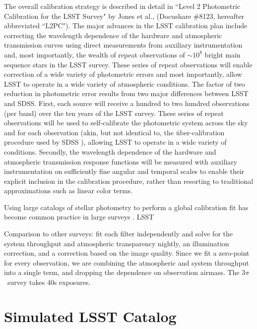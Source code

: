 \documentclass[12pt,preprint]{aastex}
\begin{document}
The overall calibration strategy is described in detail in ``Level 2
Photometric Calibration for the LSST Survey" by Jones et al.,
(Docushare \#8123, hereafter abbreviated ``L2PC"). The major advances
in the LSST calibration plan include correcting the wavelength
dependence of the hardware and atmospheric transmission curves using
direct measurements from auxiliary instrumentation and, most
importantly, the wealth of repeat observations of $\sim10^8$ bright
main sequence stars in the LSST survey. These series of repeat
observations will enable correction of a wide variety of photometric
errors and most importantly, allow LSST to operate in a wide variety
of atmospheric conditions.  The factor of two reduction in photometric
error results from two major differences between LSST and SDSS. First,
each source will receive a hundred to two hundred observations (per
band) over the ten years of the LSST survey. These series of repeat
observations will be used to self-calibrate the photometric system
across the sky and for each observation (akin, but not identical to,
the \"{u}ber-calibration procedure used by SDSS
\citep{pad08}), allowing LSST to operate in a wide variety
of conditions. Secondly, the wavelength dependence of the hardware and
atmospheric transmission response functions will be measured with
auxiliary instrumentation on sufficiently fine angular and temporal
scales to enable their explicit inclusion in the calibration
procedure, rather than resorting to traditional approximations such as
linear color terms.







Using large catalogs of stellar photometry to perform a global calibration fit has become common practice in large surveys \citep{pad08,Ofek11,Schaf12}.  LSST 


Comparison to other surveys:  \citet{Schaf12} fit each filter independently and solve for the system throughput and atmospheric transparency nightly, an illumination correction, and a correction based on the image quality.  Since we fit a zero-point for every observation, we are combining the atmospheric and system throughput into a single term, and dropping the dependence on observation airmass.  The 3$\pi$\ survey takes 40s exposures.  


\section{Simulated LSST Catalog}
\end{document}
